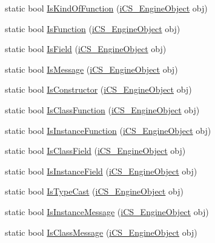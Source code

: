 \begin{DoxyCompactItemize}
\item 
static bool \hyperlink{classi_c_s___object_type_ae7b44e302ca6b15d1d7c67a6ed1382ed}{Is\+Kind\+Of\+Function} (\hyperlink{classi_c_s___engine_object}{i\+C\+S\+\_\+\+Engine\+Object} obj)
\item 
static bool \hyperlink{classi_c_s___object_type_a18d40ab3c8343d3a791a615cc6d4f0d6}{Is\+Function} (\hyperlink{classi_c_s___engine_object}{i\+C\+S\+\_\+\+Engine\+Object} obj)
\item 
static bool \hyperlink{classi_c_s___object_type_ac385c64709a61ce0cd6ffb5bc9d63939}{Is\+Field} (\hyperlink{classi_c_s___engine_object}{i\+C\+S\+\_\+\+Engine\+Object} obj)
\item 
static bool \hyperlink{classi_c_s___object_type_a4121cda490ef058c3f8fc6aa44d6eeb8}{Is\+Message} (\hyperlink{classi_c_s___engine_object}{i\+C\+S\+\_\+\+Engine\+Object} obj)
\item 
static bool \hyperlink{classi_c_s___object_type_a317d170407c93ce1deb5229b5034d606}{Is\+Constructor} (\hyperlink{classi_c_s___engine_object}{i\+C\+S\+\_\+\+Engine\+Object} obj)
\item 
static bool \hyperlink{classi_c_s___object_type_ac4e9d56fd634e645e999c7f9fa9d11d7}{Is\+Class\+Function} (\hyperlink{classi_c_s___engine_object}{i\+C\+S\+\_\+\+Engine\+Object} obj)
\item 
static bool \hyperlink{classi_c_s___object_type_a2fb30635c90eda7ef01df1a92e3687cf}{Is\+Instance\+Function} (\hyperlink{classi_c_s___engine_object}{i\+C\+S\+\_\+\+Engine\+Object} obj)
\item 
static bool \hyperlink{classi_c_s___object_type_a74dca8294a7f2624bc8e5ab729474af8}{Is\+Class\+Field} (\hyperlink{classi_c_s___engine_object}{i\+C\+S\+\_\+\+Engine\+Object} obj)
\item 
static bool \hyperlink{classi_c_s___object_type_a36c2ce85b360091116650a63fd7d1100}{Is\+Instance\+Field} (\hyperlink{classi_c_s___engine_object}{i\+C\+S\+\_\+\+Engine\+Object} obj)
\item 
static bool \hyperlink{classi_c_s___object_type_accac28e1b03b337d801fbb4483ca8e17}{Is\+Type\+Cast} (\hyperlink{classi_c_s___engine_object}{i\+C\+S\+\_\+\+Engine\+Object} obj)
\item 
static bool \hyperlink{classi_c_s___object_type_a96c81bee1f9d5775e712f984b5102475}{Is\+Instance\+Message} (\hyperlink{classi_c_s___engine_object}{i\+C\+S\+\_\+\+Engine\+Object} obj)
\item 
static bool \hyperlink{classi_c_s___object_type_a0eaf0078c4a5cf4aaa45ac9c831e3be2}{Is\+Class\+Message} (\hyperlink{classi_c_s___engine_object}{i\+C\+S\+\_\+\+Engine\+Object} obj)

\end{DoxyCompactItemize}
